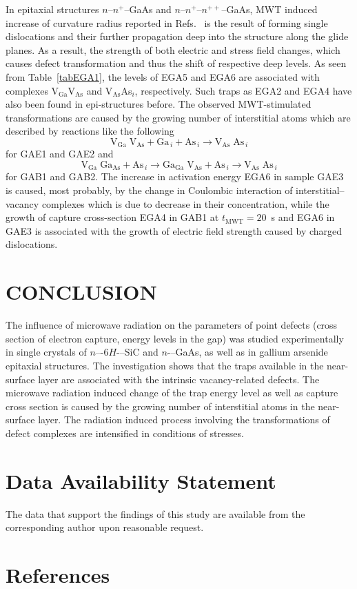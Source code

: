 \documentclass[%
 aip,jap,
 amsmath,amssymb,
 reprint,%
]{revtex4-1}
\begin{document}
In epitaxial structures $n$--$n^+$--GaAs and $n$--$n^+$--$n^{++}$--GaAs,
MWT induced increase of curvature radius reported in Refs.~
is the result of forming single dislocations and their further propagation deep into the structure along the glide planes.
As a result, the strength of both electric and stress field changes,
which causes defect transformation and thus the shift of respective deep levels.
As seen from Table~\ref{tabEGA1}, the levels of EGA5 and EGA6 are associated with complexes   V$_\mathrm{Ga}$V$_\mathrm{As}$  and V$_\mathrm{As}$As$_i$, respectively.
Such traps as EGA2 and EGA4 have also been found in epi-structures before. \cite{Yousefi1995,Mircea1975,Bourgoin:GaAs,ASHBY:GaAs,Fang:EL6,Lefevre1977,KolFTP1989En}
The observed MWT-stimulated transformations are caused by the growing number of interstitial atoms which are described by reactions like the following
\begin{displaymath}
  \mathrm{V}_\mathrm{Ga}\;\mathrm{V}_\mathrm{As}+\mathrm{Ga}_{\,i}+\mathrm{As}_{\,i} \rightarrow \mathrm{V}_\mathrm{As}\;\mathrm{As}_{\,i}
\end{displaymath}
for GAE1 and GAE2 and
\begin{displaymath}
  \mathrm{V}_\mathrm{Ga}\;\mathrm{Ga}_\mathrm{As}+\mathrm{As}_{\,i} \rightarrow
  \mathrm{Ga}_\mathrm{Ga}\;\mathrm{V}_\mathrm{As}+\mathrm{As}_{\,i} \rightarrow
  \mathrm{V}_\mathrm{As}\;\mathrm{As}_{\,i}
\end{displaymath}
for GAB1 and GAB2.
The increase in activation energy EGA6 in sample GAE3 is caused, most probably, by the change in
Coulombic interaction of interstitial--vacancy complexes
which is due to decrease in their concentration,
while the growth of capture cross-section EGA4 in GAB1 at $t_\mathrm{MWT}=20$~s
and EGA6 in GAE3 is associated with the growth of electric field strength caused by charged dislocations.


\section{CONCLUSION}
The influence of microwave radiation on the parameters of point defects (cross section of electron capture, energy levels in the gap)
was studied experimentally  in single crystals of $n$–-6$H$-–SiC and  $n$-–GaAs, as well as in gallium arsenide epitaxial structures.
The investigation shows that the traps available in the near-surface layer are associated with the intrinsic
vacancy-related defects.
The microwave radiation induced change of the trap energy level as well as capture cross section
is caused by the growing number of interstitial atoms in the near-surface layer.
The  radiation induced process involving the transformations of defect complexes are intensified in conditions of stresses.

\section*{Data Availability Statement}

The data that support the findings of this study are available from the corresponding author upon reasonable request.

\section*{References}


\end{document}
